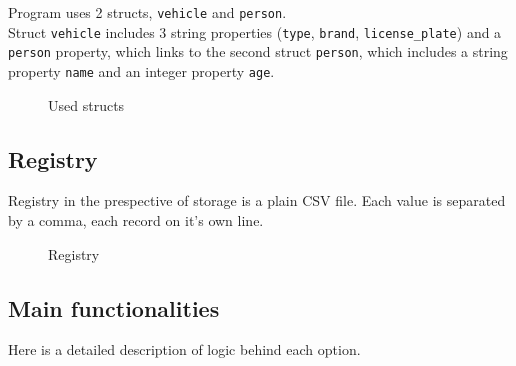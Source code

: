 \documentclass[12pt, a4paper, openright]{article}
\begin{document}
Program uses 2 structs, \texttt{vehicle} and \texttt{person}. \\
Struct \texttt{vehicle} includes 3 string properties (\texttt{type}, \texttt{brand}, \texttt{license\_plate}) 
and a \texttt{person} property, which links to the second struct \texttt{person}, 
which includes a string property \texttt{name} and an integer property \texttt{age}.

\begin{figure}[h!]
    \centering
    \caption{Used structs}
    \label{fig:placeholder}
\end{figure}

\subsection*{Registry}

Registry in the prespective of storage is a plain CSV file. Each value is separated by a comma, each record on it's own line.

\begin{figure}[h!]
    \centering
    \caption{Registry}
    \label{fig:placeholder}
\end{figure}

\subsection*{Main functionalities}

Here is a detailed description of logic behind each option.
\end{document}
